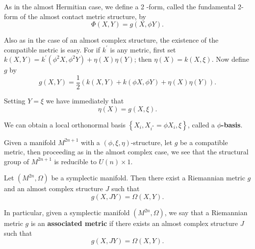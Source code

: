 \begin{remark}
        As in the almost Hermitian case, we define a 2 -form, called the fundamental 2-form of the almost contact metric structure, by 
        \begin{equation}
            \Phi(X, Y)=g(X, \phi Y). 
        \end{equation}
\end{remark}
\begin{remark}
    Also as in the case of an almost complex structure, the existence of the compatible metric is easy. For if $k^{\prime}$ is any metric, first set $k(X, Y)=k^{\prime}\left(\phi^2 X, \phi^2 Y\right)+\eta(X) \eta(Y)$; then $\eta(X)=k(X, \xi)$. Now define $g$ by
    \begin{equation}
        g(X, Y)=\frac{1}{2}(k(X, Y)+k(\phi X, \phi Y)+\eta(X) \eta(Y)).
    \end{equation}
\end{remark}


\begin{remark}
    Setting $Y=\xi$ we have immediately that
\begin{equation}
    \eta(X)=g(X, \xi).
\end{equation}
\end{remark}
\begin{remark}
    We can obtain a local orthonormal basis $\left\{X_i, X_{i^*}=\phi X_i, \xi\right\}$, called a \textbf{$\phi$-basis}.
\end{remark}
\begin{remark}
    Given a manifold $M^{2 n+1}$ with a $(\phi, \xi, \eta)$-structure, let $g$ be a compatible metric, then proceeding as in the almost complex case, we see that the structural group of $M^{2 n+1}$ is reducible to $U(n) \times 1$. 
\end{remark}

\begin{theorem}
    Let $\left(M^{2 n}, \Omega\right)$ be a symplectic manifold. Then there exist a Riemannian metric $g$ and an almost complex structure $J$ such that
$$
g(X, J Y)=\Omega(X, Y) .
$$
\end{theorem}

\begin{definition}
    In particular, given a symplectic manifold $\left(M^{2 n}, \Omega\right)$, we say that a Riemannian metric $g$ is an \textbf{associated metric} if there exists an almost complex structure $J$ such that 
    $$g(X, J Y)=\Omega(X, Y).$$
\end{definition}

